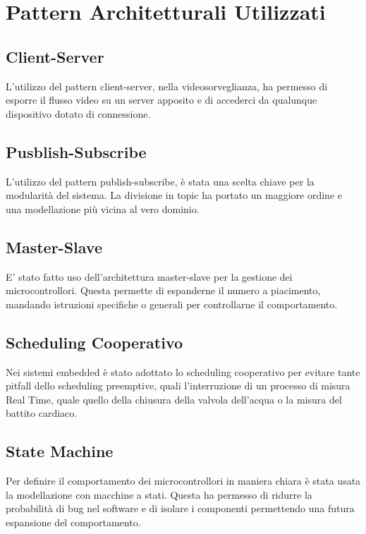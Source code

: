     \section{Pattern Architetturali Utilizzati}
        \subsection{Client-Server}
        L'utilizzo del pattern client-server, nella videosorveglianza, ha permesso di esporre il flusso video su un server apposito e di accederci da qualunque dispositivo dotato di connessione. 
    
        \subsection{Pusblish-Subscribe}
        L'utilizzo del pattern publish-subscribe, è stata una scelta chiave per la modularità del sistema. La divisione in topic ha portato un maggiore ordine e una modellazione più vicina al vero dominio. 
        
        \subsection{Master-Slave}
        E' stato fatto uso dell'architettura master-slave per la gestione dei microcontrollori. Questa permette di espanderne il numero a piacimento, mandando istruzioni specifiche o generali per controllarne il comportamento.
        
        \subsection{Scheduling Cooperativo}
        Nei sistemi embedded è stato adottato lo scheduling cooperativo per evitare tante pitfall dello scheduling preemptive, quali l'interruzione di un processo di misura Real Time, quale quello della chiusura della valvola dell'acqua o la misura del battito cardiaco.
        
        \subsection{State Machine}
        Per definire il comportamento dei microcontrollori in maniera chiara è stata usata la modellazione con macchine a stati. Questa ha permesso di ridurre la probabilità di bug nel software e di isolare i componenti permettendo una futura espansione del comportamento. 